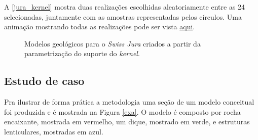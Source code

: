 A \autoref{jura_kernel} mostra duas realizações escolhidas aleatoriamente entre as 24 selecionadas, juntamente com as amostras representadas pelos círculos. Uma animação mostrando todas as realizações pode ser vista \href{https://github.com/robertorolo/kernel_support_parametrization_uncertainty_assess/blob/main/ezgif-7-b96e150c9939.gif}{aqui}.

\begin{figure}[H] 
    \centering
    \caption{Modelos geológicos para o \textit{Swiss Jura} criados a partir da parametrização do suporte do \textit{kernel}.} \label{jura_kernel}
     \hspace{1em}
\end{figure}

\subsection{Estudo de caso}

Pra ilustrar de forma prática a metodologia uma seção de um modelo conceitual foi produzida e é mostrada na Figura \autoref{exa}. O modelo é composto por rocha encaixante, mostrada em vermelho, um dique, mostrado em verde, e estruturas lenticulares, mostradas em azul.

